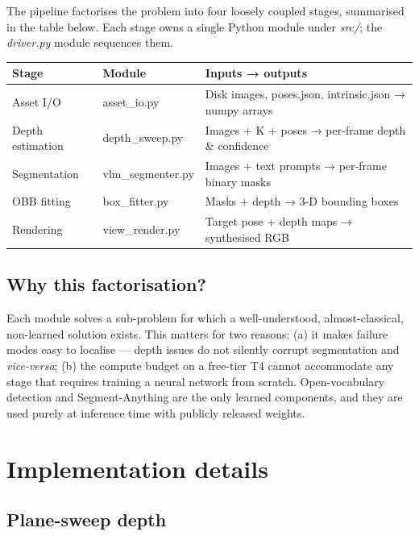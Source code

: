 \documentclass[11pt,a4paper]{article}
\begin{document}
The pipeline factorises the problem into four loosely coupled stages, summarised in the table below. Each stage owns a single Python module under \textit{src/}; the \textit{driver.py} module sequences them.

\begin{table}[h]
\centering
\small
\begin{tabular}{lll}
\toprule
\textbf{Stage} & \textbf{Module} & \textbf{Inputs → outputs} \\
\midrule
Asset I/O & asset\_io.py & Disk images, poses.json, intrinsic.json → numpy arrays \\
Depth estimation & depth\_sweep.py & Images + K + poses → per-frame depth \& confidence \\
Segmentation & vlm\_segmenter.py & Images + text prompts → per-frame binary masks \\
OBB fitting & box\_fitter.py & Masks + depth → 3-D bounding boxes \\
Rendering & view\_render.py & Target pose + depth maps → synthesised RGB \\
\bottomrule
\end{tabular}
\end{table}

\subsection{Why this factorisation?}

Each module solves a sub-problem for which a well-understood, almost-classical, non-learned solution exists. This matters for two reasons: (a) it makes failure modes easy to localise --- depth issues do not silently corrupt segmentation and \textit{vice-versa}; (b) the compute budget on a free-tier T4 cannot accommodate any stage that requires training a neural network from scratch. Open-vocabulary detection and Segment-Anything are the only learned components, and they are used purely at inference time with publicly released weights.

\newpage

\section{Implementation details}

\subsection{Plane-sweep depth}
\end{document}
